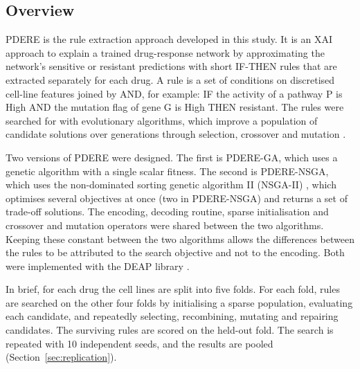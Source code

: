 
\subsection{Overview}
\label{sec:pdere-overview}

PDERE is the rule extraction approach developed in this study. It is an XAI approach to explain a trained drug-response network by approximating the network's sensitive or resistant predictions with short IF-THEN rules that are extracted separately for each drug. A rule is a set of conditions on discretised cell-line features joined by AND, for example: IF the activity of a pathway P is High AND the mutation flag of gene G is High THEN resistant. The rules were searched for with evolutionary algorithms, which improve a population of candidate solutions over generations through selection, crossover and mutation \citep{holland1975}.

Two versions of PDERE were designed. The first is PDERE-GA, which uses a genetic algorithm \citep{holland1975} with a single scalar fitness. The second is PDERE-NSGA, which uses the non-dominated sorting genetic algorithm II (NSGA-II) \citep{deb2002}, which optimises several objectives at once (two in PDERE-NSGA) and returns a set of trade-off solutions. The encoding, decoding routine, sparse initialisation and crossover and mutation operators were shared between the two algorithms. Keeping these constant between the two algorithms allows the differences between the rules to be attributed to the search objective and not to the encoding. Both were implemented with the DEAP library \citep{fortin2012}.

In brief, for each drug the cell lines are split into five folds. For each fold, rules are searched on the other four folds by initialising a sparse population, evaluating each candidate, and repeatedly selecting, recombining, mutating and repairing candidates. The surviving rules are scored on the held-out fold. The search is repeated with 10 independent seeds, and the results are pooled (Section~\ref{sec:replication}).

